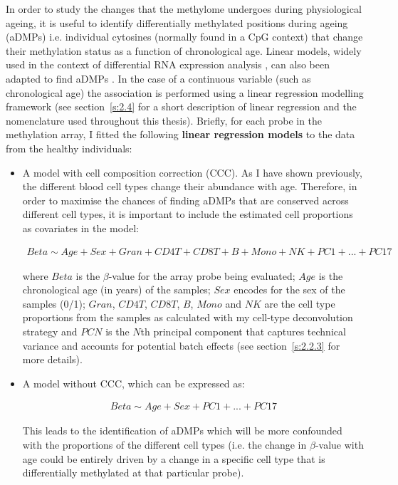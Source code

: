 \bigskip

In order to study the changes that the methylome undergoes during physiological ageing, it is useful to identify differentially methylated positions during ageing (\acrshort{aDMPs}) i.e. individual cytosines (normally found in a CpG context) that change their methylation status as a function of chronological age. Linear models, widely used in the context of differential RNA expression analysis \cite{Ritchie2015}, can also been adapted to find aDMPs \cite{Zhuang2012,Teschendorff2018}. In the case of a continuous variable (such as chronological age) the association is performed using a linear regression modelling framework \cite{Zhuang2012} (see section~\ref{s:2.4} for a short description of linear regression and the nomenclature used throughout this thesis). Briefly, for each probe in the methylation array, I fitted the following \textbf{linear regression models} to the data from the healthy individuals:

\begin{itemize}

	\item A model with cell composition correction (\acrshort{CCC}). As I have shown previously, the different blood cell types change their abundance with age. Therefore, in order to maximise the chances of finding aDMPs that are conserved across different cell types, it is important to include the estimated cell proportions as covariates in the model:
	
	\begin{align} \label{eq:2.10}
	Beta \sim Age + Sex+ Gran + CD4T + CD8T + B + Mono + NK + PC1 + ... + PC17
	\end{align}
	
	where $Beta$ is the $\beta$-value for the array probe being evaluated; $Age$ is the chronological age (in years) of the samples; $Sex$ encodes for the sex of the samples (0/1); $Gran$, $CD4T$, $CD8T$, $B$, $Mono$ and $NK$ are the cell type proportions from the samples as calculated with my cell-type deconvolution strategy and $PCN$ is the $N$th principal component that captures technical variance and accounts for potential batch effects (see section~\ref{s:2.2.3} for more details).    
	
	\item A model without CCC, which can be expressed as:
	
	\begin{align} \label{eq:2.11}
	Beta \sim Age + Sex+ PC1 + ... + PC17
	\end{align}
	
	This leads to the identification of aDMPs which will be more confounded with the proportions of the different cell types (i.e. the change in $\beta$-value with age could be entirely driven by a change in a specific cell type that is differentially methylated at that particular probe).
	
\end{itemize}

